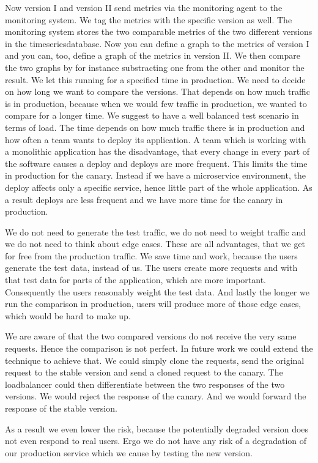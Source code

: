 Now version I and version II send metrics via the monitoring agent to the monitoring
system. We tag the metrics with the specific version as well. The monitoring system stores
the two comparable metrics of the two different versions in the timeseriesdatabase. Now
you can define a graph to the metrics of version I and you can, too, define a graph of the
metrics in version II. We then compare the two graphs by for instance substracting one
from the other and monitor the result. We let this running for a specified time in
production. We need to decide on how long we want to compare the versions. That depends on
how much traffic is in production, because when we would few traffic in production, we
wanted to compare for a longer time. We suggest to have a well balanced test scenario in
terms of load. The time depends on how much traffic there is in production and how often a
team wants to deploy its application. A team which is working with a monolithic
application has the disadvantage, that every change in every part of the software causes a
deploy and deploys are more frequent. This limits the time in production for the
canary. Instead if we have a microservice environment, the deploy affects only a specific
service, hence little part of the whole application. As a result deploys are less frequent
and we have more time for the canary in production.

We do not need to generate the test traffic, we do not need to weight traffic and we do
not need to think about edge cases. These are all advantages, that we get for free from
the production traffic. We save time and work, because the users generate the test data,
instead of us. The users create more requests and with that test data for parts of the
application, which are more important. Consequently the users reasonably weight the test
data. And lastly the longer we run the comparison in production, users will produce more
of those edge cases, which would be hard to make up.

We are aware of that the two compared versions do not receive the very same
requests. Hence the comparison is not perfect. In future work we could extend the
technique to achieve that. We could simply clone the requests, send the original request
to the stable version and send a cloned request to the canary. The loadbalancer could then
differentiate between the two responses of the two versions. We would reject the response
of the canary. And we would forward the response of the stable version.

As a result we even lower the risk, because the potentially degraded version does not even
respond to real users. Ergo we do not have any risk of a degradation of our production
service which we cause by testing the new version.

